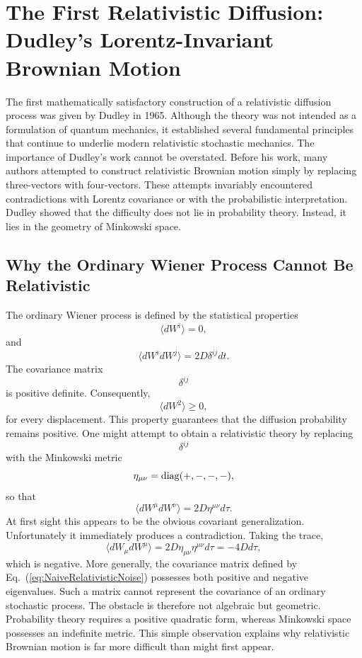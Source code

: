 \section{The First Relativistic Diffusion:
Dudley's Lorentz-Invariant Brownian Motion}
\label{sec:Dudley}
The first mathematically satisfactory construction of a relativistic
diffusion process was given by Dudley in 1965.
Although the theory was not intended as a formulation of quantum
mechanics, it established several fundamental principles that continue
to underlie modern relativistic stochastic mechanics.
The importance of Dudley's work cannot be overstated.
Before his work, many authors attempted to construct relativistic
Brownian motion simply by replacing three-vectors with four-vectors.
These attempts invariably encountered contradictions with Lorentz
covariance or with the probabilistic interpretation.
Dudley showed that the difficulty does not lie in probability theory.
Instead, it lies in the geometry of Minkowski space.
\subsection{Why the Ordinary Wiener Process Cannot Be Relativistic}
The ordinary Wiener process is defined by the statistical properties
\begin{equation}
\langle dW^i\rangle =0,
\end{equation}
and
\begin{equation}
\langle dW^i dW^j\rangle=2D\delta^{ij}dt.
\end{equation}
The covariance matrix
\[\delta^{ij}\]
is positive definite.
Consequently,
\[\langle dW^2\rangle\ge0,\]
for every displacement.
This property guarantees that the diffusion probability remains
positive.
One might attempt to obtain a relativistic theory by replacing
\[\delta^{ij}\]
with the Minkowski metric
\[\eta_{\mu\nu}={\rm diag}(+,-,-,-),\]
so that
\begin{equation}
\langle dW^\mu dW^\nu\rangle=2D\eta^{\mu\nu}d\tau .
\label{eq:NaiveRelativisticNoise}
\end{equation}
At first sight this appears to be the obvious covariant
generalization.
Unfortunately it immediately produces a contradiction.
Taking the trace,
\[\langle dW_\mu dW^\mu\rangle=2D\eta_{\mu\nu}\eta^{\mu\nu}d\tau=-4Dd\tau ,\]
which is negative.
More generally,
the covariance matrix defined by Eq.~(\ref{eq:NaiveRelativisticNoise})
possesses both positive and negative eigenvalues.
Such a matrix cannot represent the covariance of an ordinary stochastic
process.
The obstacle is therefore not algebraic but geometric.
Probability theory requires a positive quadratic form,
whereas Minkowski space possesses an indefinite metric.
This simple observation explains why relativistic Brownian motion is far
more difficult than might first appear.
